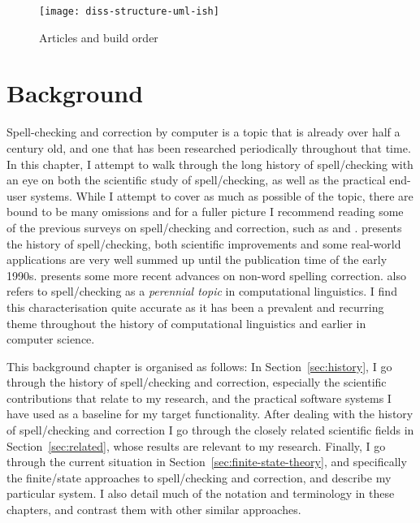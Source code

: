 \documentclass[officiallayout,final]{unihelcompling}
\begin{document}
\begin{figure}
    \texttt{[image: diss-structure-uml-ish]}
    \caption{Articles and build order
    \label{fig:schematic-diagram}}
\end{figure}

\chapter{Background}
\label{chap:background}

Spell-checking and correction by computer is a topic that is already over half
a century old, and one that has been researched periodically throughout that
time.  In this chapter, I attempt to walk through the long history of
spell\-/checking with an eye on both the scientific study of spell\-/checking,
as well as the practical end-user systems. While I attempt to cover as much as
possible of the topic, there are bound to be many omissions and for a fuller
picture I recommend reading some of the previous surveys on spell\-/checking
and correction, such as \citet{kukich1992spelling} and
\citet{mitton2009ordering}.  \citet{kukich1992spelling} presents the history of
spell\-/checking, both scientific improvements and some real-world applications
are very well summed up until the publication time of the early 1990s.
\citet{mitton2009ordering} presents some more recent advances on non-word
spelling correction.  \citet{kukich1992spelling} also refers to
spell\-/checking as a \emph{perennial topic} in computational linguistics. I
find this characterisation quite accurate as it has been a prevalent and
recurring theme throughout the history of computational linguistics and earlier
in computer science.

This background chapter is organised as follows: In Section~\ref{sec:history},
I go through the history of spell\-/checking and correction, especially the
scientific contributions that relate to my research, and the practical software
systems I have used as a baseline for my target functionality.  After dealing
with the history of spell\-/checking and correction I go through the closely
related scientific fields in Section~\ref{sec:related}, whose results are
relevant to my research. Finally, I go through the current situation in
Section~\ref{sec:finite-state-theory}, and specifically the finite\-/state
approaches to spell\-/checking and correction, and describe my particular
system. I also detail much of the notation and terminology in these chapters,
and contrast them with other similar approaches.
\end{document}
